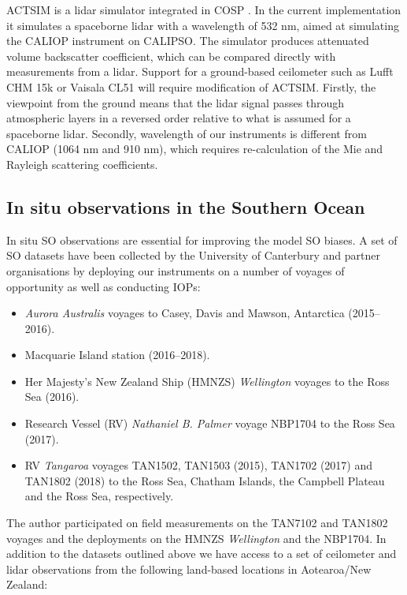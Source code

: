 ACTSIM is a lidar simulator integrated in COSP
\citep{chepfer2008,chiriaco2006}. In the current implementation it simulates a
spaceborne lidar with a wavelength of 532 nm, aimed at simulating the CALIOP
instrument on CALIPSO. The simulator produces attenuated volume backscatter
coefficient, which can be compared directly with measurements from a lidar.
Support for a ground-based ceilometer such as Lufft CHM 15k or Vaisala CL51
will require modification of ACTSIM. Firstly, the viewpoint from
the ground means that the lidar signal passes through atmospheric layers in a reversed
order relative to what is assumed for a spaceborne lidar. Secondly,
wavelength of our instruments is different from CALIOP (1064 nm and 910 nm),
which requires re-calculation of the Mie and Rayleigh scattering coefficients.

\subsection{In situ observations in the Southern Ocean}

In situ SO observations are essential for improving the model SO biases.
A set of SO datasets have been collected by the University of Canterbury
and partner organisations by deploying our instruments on a number
of voyages of opportunity as well as conducting IOPs:

\begin{itemize}
\item \textit{Aurora Australis} voyages to Casey, Davis and Mawson, Antarctica (2015--2016).
\item Macquarie Island station (2016--2018).
\item Her Majesty’s New Zealand Ship (HMNZS) \textit{Wellington} voyages to the Ross Sea (2016).
\item Research Vessel (RV) \textit{Nathaniel B. Palmer} voyage NBP1704 to the Ross Sea (2017).
\item RV \textit{Tangaroa} voyages TAN1502, TAN1503 (2015), TAN1702 (2017) and TAN1802 (2018)
to the Ross Sea, Chatham Islands, the Campbell Plateau and the Ross Sea, respectively.
\end{itemize}

\noindent
The author participated on field measurements on the TAN7102 and TAN1802 voyages and the deployments
on the HMNZS \textit{Wellington} and the NBP1704.
In addition to the datasets outlined above we have access to a set of
ceilometer and lidar observations from the following land-based locations in
Aotearoa/New Zealand:

